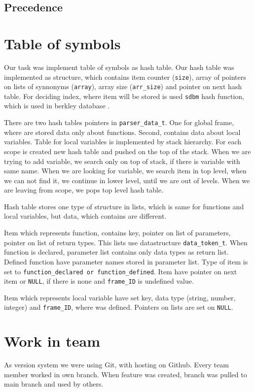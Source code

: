 \documentclass[11pt]{article}
\begin{document}
\subsection{Precedence}

\section{Table of symbols}
Our task was implement table of symbols as hash table. Our hash table was implemented as structure, which contains item counter (\texttt{size}), array of pointers on lists of synnonyms (\texttt{array}),
array size (\texttt{arr\_size}) and pointer on next hash table. For deciding index, where item will be stored is used \texttt{sdbm} hash function, which is used in berkley database \cite{hash_function}. 

There are two hash tables pointers in \texttt{parser\_data\_t}. One for global frame, where are stored data only about functions. Second, contains data about local variables. Table for local variables is implemented by
stack hierarchy. For each scope is created new hash table and pushed on the top of the stack. When we are trying to add variable, we search only on top of stack, if there is variable with same name. When we are looking for variable, we search item in top level, 
when we can not find it, we continue in lower level, until we are out of levels. When we are leaving from scope, we pops top level hash table.

Hash table stores one type of structure in lists, which is same for functions and local variables, but data, which contains are different.

Item which represents function, contains key, pointer on list of parameters, pointer on list of return types. This lists use datastructure \texttt{data\_token\_t}. When function
is declared, parameter list contains only data types as return list. Defined function have parameter names stored in parameter list. Type of item is set to \texttt{function\_declared or function\_defined}.
Item have pointer on next item or \texttt{NULL}, if there is none and \texttt{frame\_ID} is undefined value.

Item which represents local variable have set key, data type (string, number, integer) and \texttt{frame\_ID}, where was defined. Pointers on lists are set on \texttt{NULL}.



\section{Work in team}
As version system we were using Git, with hosting on Github. Every team member worked in own branch. When feature was created, branch was
pulled to main branch and used by others.
\end{document}
